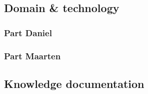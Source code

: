 \subsection{Domain \& technology}
\subsubsection{Part Daniel}
\lipsum[1]

\subsubsection{Part Maarten}
\lipsum[1]

\subsection{Knowledge documentation}
\lipsum[1]

